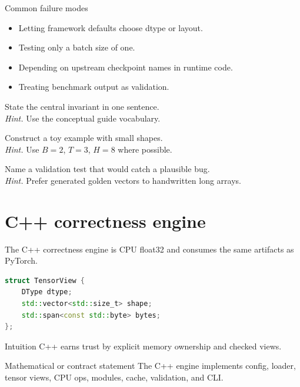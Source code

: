 \begin{warningbox}{Common failure modes}
\begin{itemize}
\item Letting framework defaults choose dtype or layout.
\item Testing only a batch size of one.
\item Depending on upstream checkpoint names in runtime code.
\item Treating benchmark output as validation.
\end{itemize}
\end{warningbox}

\begin{chapterexercises}
\item State the central invariant in one sentence.\\
\textit{Hint.} Use the conceptual guide vocabulary.
\item Construct a toy example with small shapes.\\
\textit{Hint.} Use $B=2$, $T=3$, $H=8$ where possible.
\item Name a validation test that would catch a plausible bug.\\
\textit{Hint.} Prefer generated golden vectors to handwritten long arrays.
\end{chapterexercises}

\chapter{C++ correctness engine}
\label{ch:cpp-engine}
The C++ correctness engine is CPU float32 and consumes the same artifacts as PyTorch. \citep{cpp2020,cmakeDocs}

\begin{lstlisting}[language=C++,caption={C++ artifact view sketch.}]
struct TensorView {
    DType dtype;
    std::vector<std::size_t> shape;
    std::span<const std::byte> bytes;
};
\end{lstlisting}

\begin{intuitionbox}{Intuition}
C++ earns trust by explicit memory ownership and checked views.
\end{intuitionbox}

\begin{definitionbox}{Mathematical or contract statement}
The C++ engine implements config, loader, tensor views, CPU ops, modules, cache, validation, and CLI.
\end{definitionbox}

